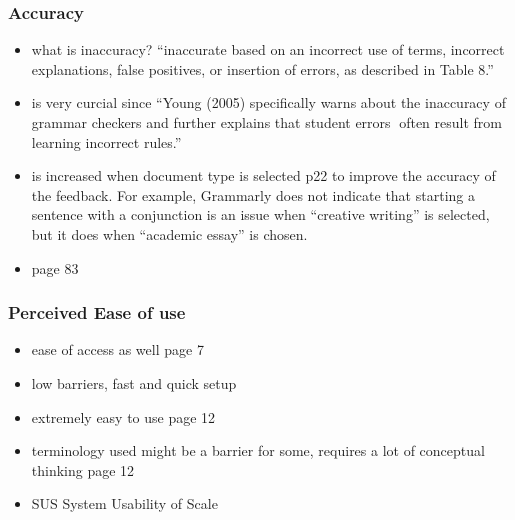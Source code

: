 \documentclass[runningheads]{llncs}
\begin{document}
\subsubsection{Accuracy}
\begin{itemize}
    \item what is inaccuracy? ``inaccurate based on an incorrect use of
terms, incorrect explanations, false positives, or insertion of errors, as
described in Table 8.''  \citep{dembsey_closing_2017}
\item is very curcial since ``Young (2005) specifically warns about the
inaccuracy of grammar checkers and further explains that student errors often result from learning incorrect rules.'' \citep{dembsey_closing_2017}
 \item is increased when document type is selected \citep{ventayen_graduate_2018} p22 to improve the accuracy of the feedback. For example, Grammarly does not indicate that starting a sentence with a conjunction is
an issue when ``creative writing'' is selected, but it does when ``academic essay'' is chosen.
\item \citep{dembsey_closing_2017} page 83

\end{itemize}



\subsubsection{Perceived Ease of use}
\begin{itemize}
    \item ease of access as well \citep{nova_utilizing_2018} page 7
    \item low barriers, fast and quick setup
    \item extremely easy to use \citep{cavaleri_you_2016} page 12
    \item terminology used might be a barrier for some, requires a lot of conceptual thinking \citep{cavaleri_you_2016} page 12
    \item SUS System Usability of Scale \citep{ventayen_graduate_2018}
\end{itemize}
\end{document}
